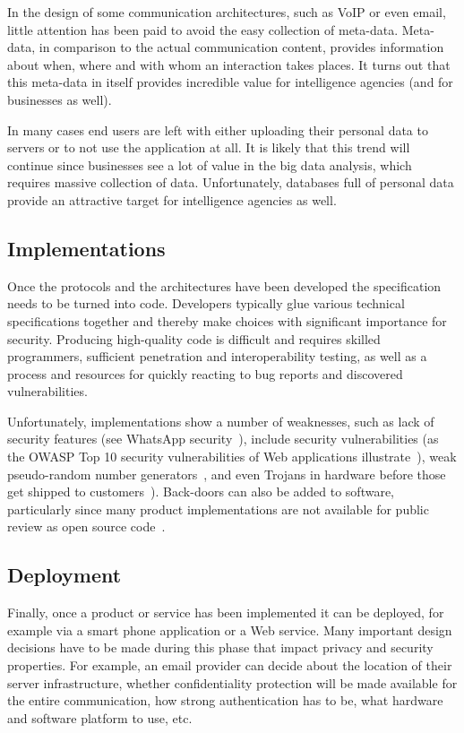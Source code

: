 \documentclass[peerreview, a4paper, 7pt]{IEEEtran}
\begin{document}
In the design of some communication architectures, such as VoIP or even email, little attention has been paid to avoid the easy collection of meta-data. Meta-data, in comparison to the actual communication content, provides information about when, where and with whom an interaction takes places. It turns out that this meta-data in itself provides incredible value for intelligence agencies (and for businesses as well).

In many cases end users are left with either uploading their personal data to servers or to not use the application at all. It is likely that this trend will continue since businesses see a lot of value in the big data analysis, which requires massive collection of data. Unfortunately, databases full of personal data provide an attractive target for intelligence agencies as well.

\subsection{Implementations}

Once the protocols and the architectures have been developed the specification needs to be turned into code. Developers typically glue various technical specifications together and thereby make choices with significant importance for security. Producing high-quality code is difficult and requires skilled programmers, sufficient penetration and interoperability testing, as well as a process and resources for quickly reacting to bug reports and discovered vulnerabilities.  

Unfortunately, implementations show a number of weaknesses, such as lack of security features (see WhatsApp security~\cite{WhatsApp}), include security vulnerabilities (as the OWASP Top 10 security vulnerabilities of Web applications illustrate~\cite{OWASP}), weak pseudo-random number generators~\cite{Heninger}, and even Trojans in hardware before those get shipped to customers~\cite{Larson,Becker}). Back-doors can also be added to software, particularly since many product implementations are not available for public review as open source code~\cite{NYT}.

\subsection{Deployment}

Finally, once a product or service has been implemented it can be deployed, for example via a smart phone application or a Web service. Many important design decisions have to be made during this phase that impact privacy and security properties. For example, an email provider can decide about the location of their server infrastructure, whether confidentiality protection will be made available for the entire communication, how strong authentication has to be, what hardware and software platform to use, etc. 
\end{document}
